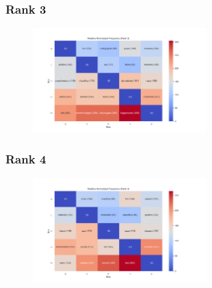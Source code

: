 \documentclass[11pt]{article}
\begin{document}
\subsubsection{Rank 3}
\begin{center}


\resizebox{\columnwidth}{!}
{
\TTRNFTable
}
\begin{figure}[h!]
  \includegraphics[width=0.6\textwidth]{figs/top_ten_rnf/rnf_w_rank_3.png}
\end{figure}
\end{center}

\pagebreak

\subsubsection{Rank 4}
\begin{center}


\resizebox{\columnwidth}{!}
{
\TTRNFTable
}
\begin{figure}[h!]
  \includegraphics[width=0.6\textwidth]{figs/top_ten_rnf/rnf_w_rank_4.png}
\end{figure}
\end{center}
\end{document}
